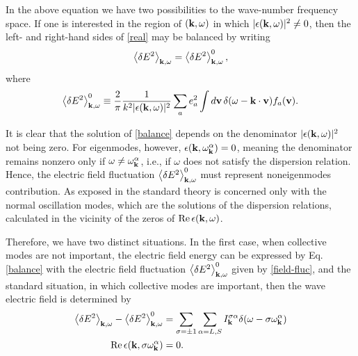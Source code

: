 \documentclass[12pt,a4paper,ruledheader]{report}
\begin{document}
In the above equation we have two possibilities to the wave-number
frequency space. If one is interested in the region of $({\bf k},\omega)$
in which $|\epsilon({\bf k},\omega)|^2\ne 0$, then the left- and right-hand
sides of \eqref{real} may be balanced by writing
\begin{equation}
  \label{balance}
  \left\langle \delta E^2 \right\rangle_{{\bf k},\omega}
  =\left\langle \delta E^2 \right\rangle_{{\bf k},\omega}^0,
\end{equation}
where
\begin{equation}
  \label{field-fluc}
  \left\langle \delta E^2 \right\rangle_{{\bf k},\omega}^0
  \equiv \frac{2}{\pi}\frac{1}{k^2|\epsilon({\bf k},\omega)|^2}
  \sum_a e_a^2 \int d{\bf v}\, \delta(\omega-{\bf k \cdot v})
  f_a({\bf v}).
\end{equation}

It is clear that the solution of \eqref{balance} depends on the denominator
$|\epsilon({\bf k},\omega)|^2$ not being zero. For eigenmodes, however,
$\epsilon({\bf k},\omega_{\bf k}^\alpha)=0$, meaning the denominator remains
nonzero only if $\omega \ne \omega_{\bf k}^\alpha$, i.e., if $\omega$ does
not satisfy the dispersion relation. Hence, the electric field fluctuation
$\left< \delta E^2 \right>_{{\bf k},\omega}^0$ must represent noneigenmodes
contribution. As exposed in  the standard theory is
concerned only with the normal oscillation modes, which are the solutions
of the dispersion relations, calculated in the vicinity of the zeros of
$\mbox{Re}\,\epsilon({\bf k},\omega)$.


Therefore, we have two distinct situations. In the first case,
when collective modes are not important, the electric field energy
can be expressed by Eq. \eqref{balance} with the electric field fluctuation
$\left< \delta E^2 \right>_{{\bf k},\omega}^0$ given by \eqref{field-fluc},
and the standard situation, in which collective modes are important,
then the wave electric field is determined by
\begin{equation}
  \label{collective}
  \begin{split}
  \left< \delta E^2 \right>_{{\bf k},\omega}
  -\left< \delta E^2 \right>_{{\bf k},\omega}^0
  &=\sum_{\sigma=\pm 1}\sum_{\alpha=L,S}
    I_{\bf k}^{\sigma \alpha}\delta(\omega-\sigma \omega_{\bf k}^\alpha)\\
  \mbox{Re}\, \epsilon({\bf k},\sigma\omega_{\bf k}^\alpha)&=0.
\end{split}
\end{equation}
\end{document}
